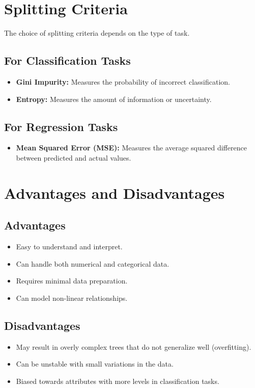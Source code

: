 \documentclass{article}
\begin{document}
\section*{Splitting Criteria}
The choice of splitting criteria depends on the type of task. 
\subsection*{For Classification Tasks}
\begin{itemize}
    \item \textbf{Gini Impurity:} Measures the probability of incorrect classification.
    \item \textbf{Entropy:} Measures the amount of information or uncertainty.
\end{itemize}
\subsection*{For Regression Tasks}
\begin{itemize}
    \item \textbf{Mean Squared Error (MSE):} Measures the average squared difference between predicted and actual values.
\end{itemize}

\section*{Advantages and Disadvantages}
\subsection*{Advantages}
\begin{itemize}
    \item Easy to understand and interpret.
    \item Can handle both numerical and categorical data.
    \item Requires minimal data preparation.
    \item Can model non-linear relationships.
\end{itemize}

\subsection*{Disadvantages}
\begin{itemize}
    \item May result in overly complex trees that do not generalize well (overfitting).
    \item Can be unstable with small variations in the data.
    \item Biased towards attributes with more levels in classification tasks.
\end{itemize}
\end{document}

